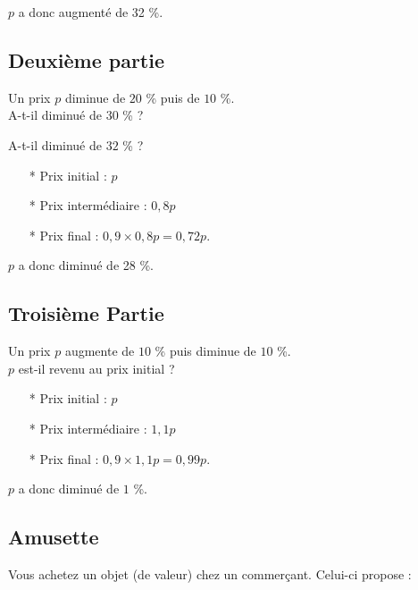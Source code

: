 \vspace{.3cm}

$p$ a donc augmenté de 32 \%.

\subsection*{Deuxième partie}

Un prix $p$ diminue de $20$ \% puis de $10$ \%. \\

A-t-il diminué de $30$ \% ? 

A-t-il diminué de $32$ \% ? \\

\begin{enumerate}
\item[*] Prix initial : $p$
\item[*] Prix intermédiaire : $0,8p$
\item[*] Prix final : $0,9 \times 0,8p = 0,72 p $. 
\end{enumerate} 

\vspace{.3cm}

$p$ a donc diminué de 28 \%.

\subsection*{Troisième Partie}

Un prix $p$ augmente de $10$ \% puis diminue de $10$ \%. \\

$p$ est-il revenu au prix initial ? \\

\begin{enumerate}
\item[*] Prix initial : $p$
\item[*] Prix intermédiaire : $1,1p$
\item[*] Prix final : $0,9 \times 1,1p = 0,99 p $. 
\end{enumerate} 

\vspace{.3cm}

$p$ a donc diminué de $1$ \%.

\newpage

\subsection*{Amusette}

Vous achetez un objet (de valeur) chez un commerçant. Celui-ci propose :

